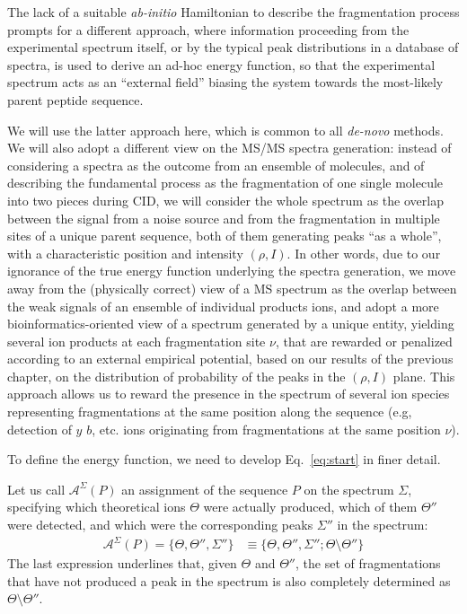 The lack of a suitable \emph{ab-initio} Hamiltonian to describe the
fragmentation process prompts for a different approach, where information
proceeding from the experimental spectrum itself, or by the typical peak
distributions in a database of spectra, is used to derive an ad-hoc energy
function, so that the experimental spectrum acts as an ``external field''
biasing the system towards the most-likely parent peptide sequence.

We will use the latter approach here, which is common to all \emph{de-novo}
methods. We will also adopt a different view on the MS/MS spectra generation:
instead of considering a spectra  as the outcome  from an ensemble of molecules,
and of describing the fundamental process as the fragmentation of one single
molecule into two pieces during CID,  we will consider the whole spectrum as the
overlap between the signal from a noise source and from the fragmentation in
multiple sites of a unique parent sequence, both of them generating peaks ``as a
whole'', with a characteristic position and intensity $(\rho,I)$.
In other words, due to our ignorance of the true energy function underlying the
spectra generation, we move away from the (physically correct) view of a MS
spectrum as the overlap between the weak signals of an ensemble of individual
products ions, and adopt a more bioinformatics-oriented view of a spectrum
generated by a unique entity, yielding several ion products at each
fragmentation site $\nu$, that are rewarded or penalized according to an
external empirical potential, based on our results of the previous chapter, on
the distribution of probability of the peaks in the $(\rho,I)$ plane. This
approach allows us to reward the presence in the spectrum of several ion species
representing fragmentations at the same position along the sequence (e.g,
detection of $y$ $b$, etc. ions originating from fragmentations at the same
position $\nu$).

To define the energy function, we need to develop Eq.~\ref{eq:start} in finer detail.



Let us call $\mathcal A^\Sigma(P)$ an assignment of the sequence $P$ on the
spectrum $\Sigma$, specifying which theoretical ions $\Theta$ were actually
produced, which of them $\Theta''$  were  detected, and which were the
corresponding peaks $\Sigma''$ in the spectrum:
\begin{align}
\mathcal A^\Sigma(P)=\{\Theta,\Theta'',\Sigma''\}&\equiv
\{\Theta,\Theta'',\Sigma'';\Theta\setminus\Theta''\}
\label{eq:assignment}
\end{align}
The last expression underlines that, given $\Theta$  and $\Theta''$, the set of
fragmentations that have not produced a peak in the spectrum is also completely
determined as $\Theta\setminus\Theta''$.



